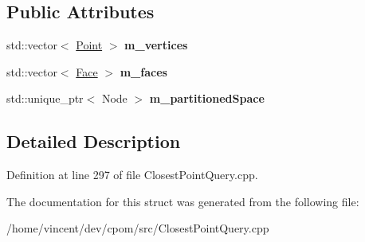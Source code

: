 \subsection*{Public Attributes}
\begin{DoxyCompactItemize}
\item 
std\+::vector$<$ \hyperlink{structcpom_1_1_float3}{Point} $>$ {\bfseries m\+\_\+vertices}\hypertarget{structcpom_1_1_closest_point_query_1_1_impl_a10e2d648acd7229003837b74cddee713}{}\label{structcpom_1_1_closest_point_query_1_1_impl_a10e2d648acd7229003837b74cddee713}

\item 
std\+::vector$<$ \hyperlink{structcpom_1_1_face}{Face} $>$ {\bfseries m\+\_\+faces}\hypertarget{structcpom_1_1_closest_point_query_1_1_impl_ac37d1012841b1e96978fdca87f113a87}{}\label{structcpom_1_1_closest_point_query_1_1_impl_ac37d1012841b1e96978fdca87f113a87}

\item 
std\+::unique\+\_\+ptr$<$ Node $>$ {\bfseries m\+\_\+partitioned\+Space}\hypertarget{structcpom_1_1_closest_point_query_1_1_impl_adc58145aa33cd69a857257294044f7da}{}\label{structcpom_1_1_closest_point_query_1_1_impl_adc58145aa33cd69a857257294044f7da}

\end{DoxyCompactItemize}


\subsection{Detailed Description}


Definition at line 297 of file Closest\+Point\+Query.\+cpp.



The documentation for this struct was generated from the following file\+:\begin{DoxyCompactItemize}
\item 
/home/vincent/dev/cpom/src/Closest\+Point\+Query.\+cpp\end{DoxyCompactItemize}
